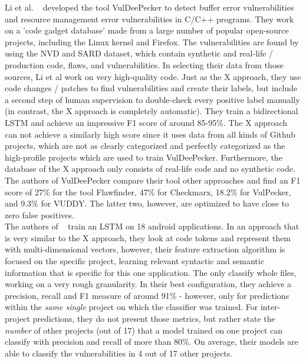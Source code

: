 \documentclass[
a4paper,
pagesize,
pdftex,
12pt,
twoside, %
BCOR=5mm, %
ngerman,
fleqn,
final,
]{scrartcl}
\begin{document}
	Li et al. ~\cite{Li.2018} developed the tool VulDeePecker to detect buffer error vulnerabilities and resource management error vulnerabilities in C/C++ programs. They work on a 'code gadget database' made from a large number of popular open-source projects, including the Linux kernel and Firefox. The vulnerabilities are found by using the NVD and SARD dataset, which contain synthetic and real-life / production code, flaws, and vulnerabilities. In selecting their data from those sources, Li et al work on very high-quality code. Just as the X approach, they use code changes / patches to find vulnerabilities and create their labels, but include a second step of human supervision to double-check every positive label manually (in contrast, the X approach is completely automatic). They train a bidirectional LSTM and achieve an impressive F1 score of around 85-95\%. The X approach can not achieve a similarly high score since it uses data from all kinds of Github projects, which are not as clearly categorized and perfectly categorized as the high-profile projects which are used to train VulDeePecker. Furthermore, the database of the X approach only consists of real-life code and no synthetic code.\\
	
	The authors of VulDeePecker compare their tool other approaches and find an F1 score of 27\% for the tool Flawfinder, 47\% for Checkmarx, 18.2\% for VulPecker, and 9.3\% for VUDDY. The latter two, however, are optimized to have close to zero false positives.\\
	
	The authors of ~\cite{Dam.2017} train an LSTM on 18 android applications. In an approach that is very similar to the X approach, they look at code tokens and represent them with multi-dimensional vectors, however, their feature extraction algorithm is focused on the specific project, learning relevant syntactic and semantic information that is specific for this one application. The only classify whole files, working on a very rough granularity. In their best configuration, they achieve a precision, recall and F1 measure of around 91\% - however, only for predictions within the \textit{same single} project on which the classifier was trained. For inter-project predictions, they do not present those metrics, but rather state the \textit{number} of other projects (out of 17) that a model trained on one project can classify with precision and recall of more than 80\%. On average, their models are able to classify the vulnerabilities in 4 out of 17 other projects.\\
	
\end{document}
